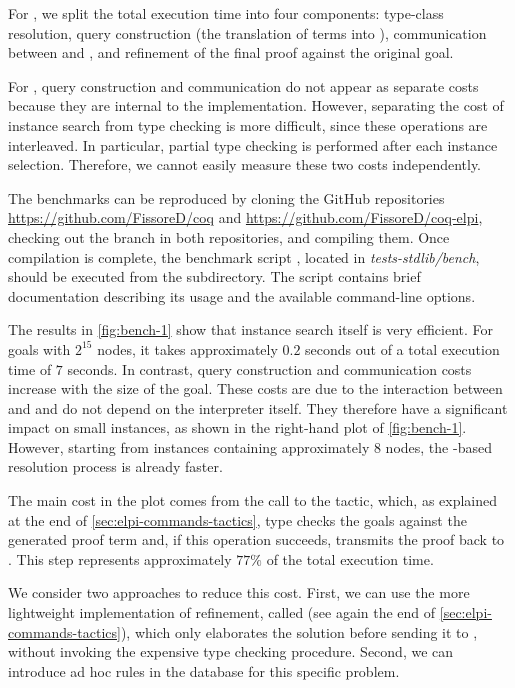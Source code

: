 For \elpi, we split the total execution time into four components: type-class
resolution, query construction (the translation of \rocq terms into \elpi),
communication between \elpi and \rocq, and refinement of the final proof against
the original goal.

For \rocq, query construction and communication do not appear as separate costs
because they are internal to the implementation. However, separating the cost
of instance search from type checking is more difficult, since these operations
are interleaved. In particular, partial type checking is performed after each
instance selection. Therefore, we cannot easily measure these two costs
independently.

The benchmarks can be reproduced by cloning the GitHub repositories
\url{https://github.com/FissoreD/coq} and
\url{https://github.com/FissoreD/coq-elpi}, checking out the  branch in
both repositories, and compiling them. Once compilation is complete, the
benchmark script , located in \textit{tests-stdlib/bench},
should be executed from the  subdirectory. The script contains brief
documentation describing its usage and the available command-line options.

The results in \cref{fig:bench-1} show that instance search itself is very
efficient. For goals with $2^{15}$ nodes, it takes approximately $0.2$ seconds
out of a total execution time of $7$ seconds. In contrast, query construction
and communication costs increase with the size of the goal. These costs are due
to the interaction between \rocq and \elpi and do not depend on the \elpi
interpreter itself. They therefore have a significant impact on small instances,
as shown in the right-hand plot of \cref{fig:bench-1}. However, starting from
instances containing approximately $8$ nodes, the \elpi-based resolution process
is already faster.

The main cost in the plot comes from the call to the  tactic, which,
as explained at the end of \cref{sec:elpi-commands-tactics}, type checks the
goals against the generated proof term and, if this operation succeeds,
transmits the proof back to \rocq. This step represents approximately $77\%$ of
the total execution time.

We consider two approaches to reduce this cost. First, we can use the more
lightweight implementation of refinement, called  (see
again the end of \cref{sec:elpi-commands-tactics}), which only elaborates the
solution before sending it to \rocq, without invoking the expensive type
checking procedure. Second, we can introduce ad hoc rules in the \elpi database
for this specific problem.

